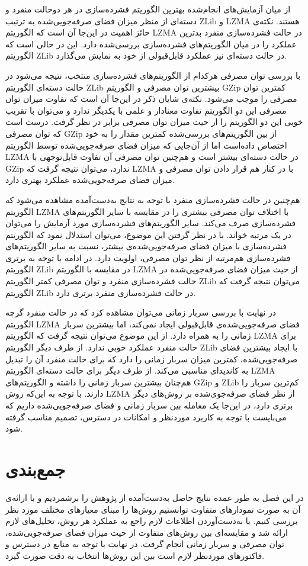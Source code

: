از میان آزمایش‌های انجام‌شده بهترین الگوریتم فشرده‌سازی در هر دوحالت منفرد و دسته‌ای از منظر میزان فضای صرفه‌جویی‌شده به ترتیب ZLib و LZMA هستند. نکته‌ی حائز اهمیت در این‌جا آن است که الگوریتم LZMA در حالت فشرده‌سازی منفرد بدترین عملکرد را در میان الگوریتم‌های فشرده‌سازی بررسی‌شده دارد. این در حالی است که الگوریتم ZLib در حالت دسته‌ای نیز عملکرد قابل‌قبولی از خود به نمایش می‌گذارد. 

با بررسی توان مصرفی هرکدام از الگوریتم‌های فشرده‌سازی منتخب،‌ نتیجه می‌شود در حالت دسته‌ای الگوریتم ZLib بیشترین توان مصرفی و الگوریتم GZip کمترین توان مصرفی را موجب می‌شود. نکته‌ی شایان ذکر در این‌جا آن است که تفاوت میزان توان مصرفی این دو الگوریتم تفاوت معنادار و علمی با یکدیگر ندارد و می‌توان با تقریب خوبی این دو الگوریتم را از حیث میزان توان مصرفی برابر در نظر گرفت. درست است که توان مصرفی GZip از بین الگوریتم‌های بررسی‌شده کمترین مقدار را به خود اختصاص داده‌است اما از آن‌جایی که میزان فضای صرفه‌جویی‌شده توسط الگوریتم LZMA در حالت دسته‌ای بیشتر است و هم‌چنین توان مصرفی آن تفاوت قابل‌توجهی با GZip ندارد، می‌توان نتیجه گرفت که LZMA با در کنار هم قرار دادن توان مصرفی و میزان فضای صرفه‌جویی‌شده عملکرد بهتری دارد.

هم‌چنین در حالت فشرده‌سازی منفرد با توجه به نتایج به‌دست‌آمده مشاهده می‌شود که الگوریتم LZMA با اختلاف توان مصرفی بیشتری را در مقایسه با سایر الگوریتم‌های فشرده‌سازی صرف می‌کند. سایر الگوریتم‌های فشرده‌سازی  مورد آزمایش را می‌توان در یک مرتبه خواند. با در نظر گرفتن این موضوع، می‌توان استدلال نمود که الگوریتم فشرده‌سازی با میزان فضای صرفه‌جویی‌شده‌ی بیشتر، نسبت به سایر الگوریتم‌های فشرده‌سازی هم‌مرتبه از نظر توان مصرفی، اولویت دارد. در ادامه با توجه به برتری الگوریتم ZLib در مقایسه با الگوریتم LZMA از حیث میزان فضای صرفه‌جویی‌شده در حالت فشرده‌سازی منفرد و توان مصرفی کمتر الگوریتم ZLib می‌توان نتیجه گرفت که الگوریتم ZLib در حالت فشرده‌سازی منفرد برتری دارد.

در نهایت با بررسی سربار زمانی می‌توان مشاهده کرد که در حالت منفرد گرچه الگوریتم LZMA فضای صرفه‌جویی‌شده‌ی قابل‌قبولی ایجاد نمی‌کند، اما بیشترین سربار زمانی را به همراه دارد. از این موضوع می‌توان نتیجه گرفت که الگوریتم LZMA برای حالت منفرد عملکرد خوبی ندارد. از طرف دیگر الگوریتم ZLib با ایجاد بیشترین فضای صرفه‌جویی‌شده، کمترین میزان سربار زمانی را دارد که برای حالت منفرد آن را تبدیل به کاندیدای مناسبی می‌کند. از طرف دیگر برای حالت دسته‌ای الگوریتم LZMA هم‌چنان بیشترین سربار زمانی را داشته و الگوریتم‌های GZip و ZLib کم‌ترین سربار را دارند. با توجه به این‌که روش LZMA از نظر فضای صرفه‌جوی‌شده بر روش‌های دیگر برتری دارد، در این‌جا یک معامله بین سربار زمانی و فضای صرفه‌جویی‌شده داریم که می‌بایست با توجه به کاربرد موردنظر و امکانات در دسترس، تصمیم مناسب گرفته شود.
\section{جمع‌بندی}
در این فصل به طور عمده نتایج حاصل به‌دست‌آمده از پژوهش را برشمردیم و با ارائه‌ی آن به صورت نمودارهای متفاوت توانستیم روش‌ها را مبنای معیارهای مختلف مورد نظر بررسی کنیم. با به‌دست‌آوردن اطلاعات لازم راجع به عملکرد هر روش، تحلیل‌های لازم ارائه شد و مقایسه‌ای بین روش‌های متفاوت از حیث میزان فضای صرفه‌جویی‌شده، توان مصرفی و سربار زمانی انجام گرفت. در نهایت با توجه به منابع در دسترس و فاکتورهای موردنظر لازم است بین این روش‌ها انتخاب به دقت صورت گیرد.